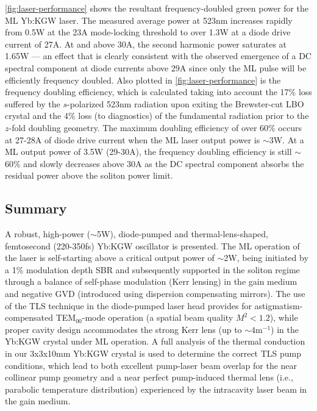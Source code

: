 \ref{fig:laser-performance} shows the resultant frequency-doubled green power for the ML Yb:KGW laser.
The measured average power at 523nm increases rapidly from 0.5W at the 23A mode-locking threshold to over 1.3W at a diode drive current of 27A.
At and above 30A, the second harmonic power saturates at 1.65W --- an effect that is clearly consistent with the observed emergence of a DC spectral component at diode currents above 29A since only the ML pulse will be efficiently frequency doubled.
Also plotted in \ref{fig:laser-performance} is the frequency doubling efficiency, which is calculated taking into account the 17\% loss suffered by the $s$-polarized 523nm radiation upon exiting the Brewster-cut LBO crystal and the 4\% loss (to diagnostics) of the fundamental radiation prior to the $z$-fold doubling geometry.
The maximum doubling efficiency of over 60\% occurs at 27-28A of diode drive current when the ML laser output power is $\sim$3W.
At a ML output power of 3.5W (29-30A), the frequency doubling efficiency is still $\sim$60\% and slowly decreases above 30A as the DC spectral component absorbs the residual power above the soliton power limit.

\subsection{Summary}


A robust, high-power ($\sim$5W), diode-pumped and thermal-lens-shaped, femtosecond (220-350fs) Yb:KGW oscillator is presented.
The ML operation of the laser is self-starting above a critical output power of $\sim$2W, being initiated by a 1\% modulation depth SBR and subsequently supported in the soliton regime through a balance of self-phase modulation (Kerr lensing) in the gain medium and negative GVD (introduced using dispersion compensating mirrors).
The use of the TLS technique in the diode-pumped laser head provides for astigmatism-compensated TEM$_{00}$-mode operation (a spatial beam quality $M^2 <1.2$), while proper cavity design accommodates the strong Kerr lens (up to $\sim4\text{m}^{-1}$) in the Yb:KGW crystal under ML operation.
A full analysis of the thermal conduction in our 3x3x10mm Yb:KGW crystal is used to determine the correct TLS pump conditions, which lead to both excellent pump-laser beam overlap for the near collinear pump geometry and a near perfect pump-induced thermal lens (i.e., parabolic temperature distribution) experienced by the intracavity laser beam in the gain medium.

